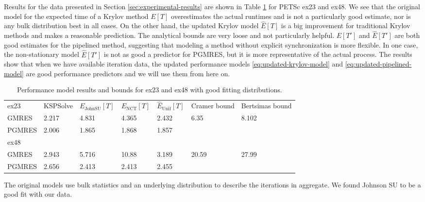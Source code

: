 \documentclass[sigconf, anonymous]{acmart}
\begin{document}
Results for the data presented in Section \ref{sec:experimental-results} are shown in Table \ref{tab:performance-model} for PETSc ex23 and ex48.
We see that the original model for the expected time of a Krylov method $E[T]$  overestimates the actual runtimes and is not a particularly good estimate, nor is any bulk distribution best in all cases.  On the other hand, the updated Krylov model $\widehat{E}[T]$ is a big improvement for traditional Krylov methods and makes a reasonable prediction. The analytical bounds are very loose and not particularly helpful.
$E[T']$ and $\widehat{E}[T']$ are both good estimates for the pipelined method, suggesting that modeling a method without explicit synchronization is more flexible. 
In one case, the non-stationary model $\widehat{E}[T']$ is not as good a predictor for PGMRES, but it is more representative of the actual process. 
The results show that when we have available iteration data, the updated performance models \eqref{eq:updated-krylov-model} and \eqref{eq:updated-pipelined-model} are good performance predictors and we will use them from here on. 

\begin{table}[t]
\caption{Performance model results and bounds for ex23 and ex48 with good fitting distributions.}
\begin{center}
\begin{tabular}{| l l l l l  l l |} \hline
 ex23 & KSPSolve & $E_{\text {JohnSU}}\left[T\right]$ & $E_{\text {NCT}}\left[T\right]$ & $\widehat{E}_{\text {Unif}}\left[T\right]$  & Cramer bound & Bertsimas bound \\
 GMRES & 2.217 & 4.831 & 4.365   & 2.432  & 6.35 & 8.102 \\
 PGMRES & 2.006 & 1.865 & 1.868 & 1.857 & &  \\ \hline
 ex48 &  &  &  &  & & \\
 GMRES & 2.943 & 5.716 & 10.88  & 3.189 & 20.59  & 27.99 \\
 PGMRES & 2.656 & 2.413 & 2.413 & 2.455   & & \\
\hline  %
\end{tabular} \label{tab:performance-model}
\end{center}
\end{table}

\iffalse
The original models use bulk statistics and an underlying distribution to describe the iterations in aggregate. We found Johnson SU to be a good fit with our data. 
\end{document}
